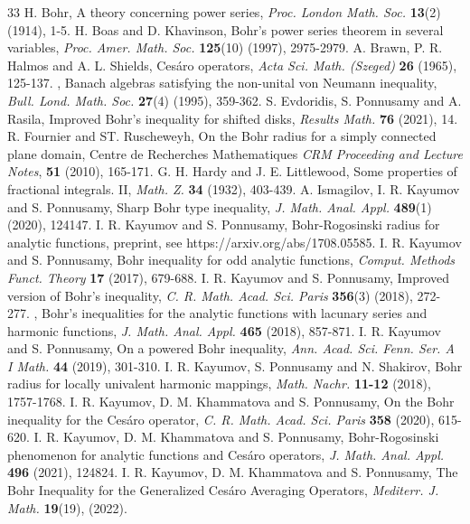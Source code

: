 \documentclass[11pt,reqno]{amsart}
\newtheorem{open problem}{Open problem}[section]
\numberwithin{equation}{section}
\begin{document}
\begin{thebibliography}{33}
 {\sc H. Bohr}, A theory concerning power series, {\it Proc. London Math. Soc.} {\bf13}(2) (1914), 1-5.
 {\sc H. Boas and D. Khavinson}, Bohr’s power series theorem in several variables, {\it Proc. Amer. Math. Soc.} {\bf125}(10) (1997), 2975-2979.
 {\sc A. Brawn, P. R. Halmos and A. L. Shields}, Ces\'aro operators, {\it Acta Sci. Math. (Szeged)} {\bf26} (1965), 125-137.
, Banach algebras satisfying the non-unital von Neumann inequality, {\it Bull. Lond. Math. Soc.} {\bf27}(4) (1995), 359-362.
 {\sc S. Evdoridis, S. Ponnusamy and A. Rasila}, Improved Bohr’s inequality for shifted disks, {\it Results Math.} {\bf76} (2021), 14.
 {\sc R. Fournier and ST. Ruscheweyh}, On the Bohr radius for a simply connected plane domain, Centre de Recherches Mathematiques {\it CRM Proceeding and Lecture Notes}, {\bf51} (2010), 165-171.
 {\sc G. H. Hardy and J. E. Littlewood}, Some properties of fractional integrals. II, {\it Math. Z.} {\bf34} (1932), 403-439.
 {\sc A. Ismagilov, I. R. Kayumov and S. Ponnusamy}, Sharp Bohr type inequality, {\it J. Math. Anal. Appl.} {\bf489}(1) (2020), 124147.
 {\sc I. R. Kayumov and S. Ponnusamy}, Bohr-Rogosinski radius for analytic functions, preprint, see https://arxiv.org/abs/1708.05585.
 {\sc I. R. Kayumov and S. Ponnusamy}, Bohr inequality for odd analytic functions, {\it Comput. Methods Funct. Theory} {\bf17} (2017), 679-688.
 {\sc I. R. Kayumov and S. Ponnusamy}, Improved version of Bohr’s inequality, {\it C. R. Math. Acad. Sci. Paris} {\bf356}(3) (2018), 272-277.
, Bohr’s inequalities for the analytic functions with lacunary series and harmonic functions, {\it J. Math. Anal. Appl.} {\bf465} (2018), 857-871.
 {\sc I. R. Kayumov and S. Ponnusamy}, On a powered Bohr inequality, {\it Ann. Acad. Sci. Fenn. Ser. A I Math.} {\bf44} (2019), 301-310.
 {\sc I. R. Kayumov, S. Ponnusamy and N. Shakirov}, Bohr radius for locally univalent harmonic mappings, {\it Math. Nachr.} {\bf11-12} (2018), 1757-1768.
 {\sc I. R. Kayumov, D. M. Khammatova and S. Ponnusamy}, On the Bohr inequality for the Ces\'aro operator, {\it C. R. Math. Acad. Sci. Paris} {\bf 358} (2020), 615-620.
 {\sc I. R. Kayumov, D. M. Khammatova and S. Ponnusamy}, Bohr-Rogosinski phenomenon for analytic functions and Ces\'aro operators, {\it J. Math. Anal. Appl.} {\bf496} (2021), 124824.
 {\sc I. R. Kayumov, D. M. Khammatova and S. Ponnusamy}, The Bohr Inequality for the Generalized Ces\'aro Averaging Operators, {\it Mediterr. J. Math.} {\bf19}(19), (2022).

\end{thebibliography}
\end{document}
